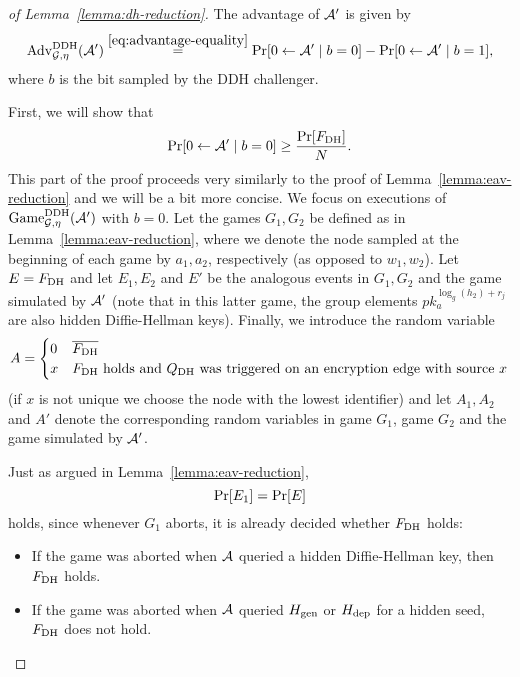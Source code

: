 \begin{proof}[of Lemma~\ref{lemma:dh-reduction}]
	The advantage of $\mathcal{A}'$ is given by
	\begin{equation} \label{eq:lemma-dh-reduction-advantage}
		\advantage{\mathcal{G}}{\eta}{DDH}(\adv') \stackrel{\eqref{eq:advantage-equality}}{=} \pr{0 \from \adv' \mid b = 0} - \pr{0 \from \adv' \mid b = 1},
	\end{equation}
	where $b$ is the bit sampled by the DDH challenger.

	First, we will show that
	\begin{equation} \label{eq:lemma-dh-reduction-b=0}
		\pr{0 \from \adv' \mid b = 0} \ge \frac{\pr{\fdh}}{N}.
	\end{equation}
	This part of the proof proceeds very similarly to the proof of Lemma~\ref{lemma:eav-reduction} and we will be a bit more concise. We focus on executions of $\mathrm{Game}_{\mathcal{G}, \eta}^{\mathrm{DDH}}(\mathcal{A}')$ with $b = 0$. Let the games $G_1, G_2$ be defined as in Lemma~\ref{lemma:eav-reduction}, where we denote the node sampled at the beginning of each game by $a_1, a_2$, respectively (as opposed to $w_1, w_2$). Let $E = F_\mathrm{DH}$ and let $E_1, E_2$ and $E'$ be the analogous events in $G_1, G_2$ and the game simulated by $\mathcal{A}'$ (note that in this latter game, the group elements $pk_a^{\log_g(h_2) + r_j}$ are also hidden Diffie-Hellman keys). Finally, we introduce the random variable
	\[
		A = \begin{cases}
			0 & \overline{F_\mathrm{DH}}                                                                    \\
			x & \text{$F_\mathrm{DH}$ holds and $Q_\mathrm{DH}$ was triggered on an encryption edge with source $x$}
		\end{cases}
	\]
	(if $x$ is not unique we choose the node with the lowest identifier) and let $A_1, A_2$ and $A'$ denote the corresponding random variables in game $G_1$, game $G_2$ and the game simulated by $\mathcal{A}'$.

	Just as argued in Lemma~\ref{lemma:eav-reduction},
	\begin{equation} \label{eq:lemma-dh-reduction-E=E_1}
		\pr{E_1} = \pr{E}
	\end{equation}
	holds, since whenever $G_1$ aborts, it is already decided whether $F_\mathrm{DH}$ holds:
	\begin{itemize}
		\item If the game was aborted when $\mathcal{A}$ queried a hidden Diffie-Hellman key, then $F_\mathrm{DH}$ holds.
		\item If the game was aborted when $\mathcal{A}$ queried $H_\mathrm{gen}$ or $H_\mathrm{dep}$ for a hidden seed, $F_\mathrm{DH}$ does not hold.
	\end{itemize}


\end{proof}

